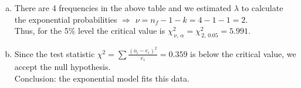 \documentclass[12pt]{article}
\begin{document}
{\begin{minipage}[t]{0.98\textwidth}
\begin{enumerate}[a)]
\begin{center}
\begin{tabular}{|c|cccc|c|}
\hline
\multicolumn{6}{c}{}
\end{tabular}
\end{center}
\item There are 4 frequencies in the above table and we estimated $\lambda$ to calculate the exponential probabilities $\Rightarrow$ $\nu = n_f -1 -k = 4 - 1 - 1 = 2$.\\[0.3cm]
    Thus, for the 5\% level the critical value is $\chi^2_{\,\nu,\,\alpha} = \chi^2_{\,2,\,0.05} = 5.991.$\\[0.1cm]
\item Since the test statistic $\chi^2 = \sum \frac{(o_i-e_i)^2}{e_i}  =  0.359$ is below the critical value, we accept the null hypothesis.\\[0.3cm]
    Conclusion: the exponential model fits this data.
\end{enumerate}
\end{minipage}}\vspace{0.03\textwidth}
\end{document}
